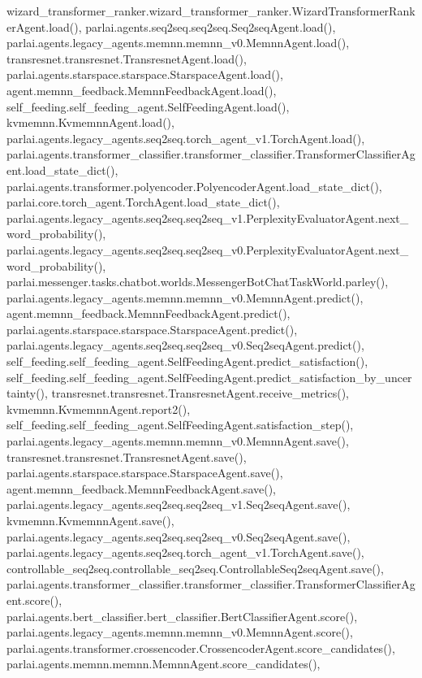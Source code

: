 wizard\+\_\+transformer\+\_\+ranker.\+wizard\+\_\+transformer\+\_\+ranker.\+Wizard\+Transformer\+Ranker\+Agent.\+load(), parlai.\+agents.\+seq2seq.\+seq2seq.\+Seq2seq\+Agent.\+load(), parlai.\+agents.\+legacy\+\_\+agents.\+memnn.\+memnn\+\_\+v0.\+Memnn\+Agent.\+load(), transresnet.\+transresnet.\+Transresnet\+Agent.\+load(), parlai.\+agents.\+starspace.\+starspace.\+Starspace\+Agent.\+load(), agent.\+memnn\+\_\+feedback.\+Memnn\+Feedback\+Agent.\+load(), self\+\_\+feeding.\+self\+\_\+feeding\+\_\+agent.\+Self\+Feeding\+Agent.\+load(), kvmemnn.\+Kvmemnn\+Agent.\+load(), parlai.\+agents.\+legacy\+\_\+agents.\+seq2seq.\+torch\+\_\+agent\+\_\+v1.\+Torch\+Agent.\+load(), parlai.\+agents.\+transformer\+\_\+classifier.\+transformer\+\_\+classifier.\+Transformer\+Classifier\+Agent.\+load\+\_\+state\+\_\+dict(), parlai.\+agents.\+transformer.\+polyencoder.\+Polyencoder\+Agent.\+load\+\_\+state\+\_\+dict(), parlai.\+core.\+torch\+\_\+agent.\+Torch\+Agent.\+load\+\_\+state\+\_\+dict(), parlai.\+agents.\+legacy\+\_\+agents.\+seq2seq.\+seq2seq\+\_\+v1.\+Perplexity\+Evaluator\+Agent.\+next\+\_\+word\+\_\+probability(), parlai.\+agents.\+legacy\+\_\+agents.\+seq2seq.\+seq2seq\+\_\+v0.\+Perplexity\+Evaluator\+Agent.\+next\+\_\+word\+\_\+probability(), parlai.\+messenger.\+tasks.\+chatbot.\+worlds.\+Messenger\+Bot\+Chat\+Task\+World.\+parley(), parlai.\+agents.\+legacy\+\_\+agents.\+memnn.\+memnn\+\_\+v0.\+Memnn\+Agent.\+predict(), agent.\+memnn\+\_\+feedback.\+Memnn\+Feedback\+Agent.\+predict(), parlai.\+agents.\+starspace.\+starspace.\+Starspace\+Agent.\+predict(), parlai.\+agents.\+legacy\+\_\+agents.\+seq2seq.\+seq2seq\+\_\+v0.\+Seq2seq\+Agent.\+predict(), self\+\_\+feeding.\+self\+\_\+feeding\+\_\+agent.\+Self\+Feeding\+Agent.\+predict\+\_\+satisfaction(), self\+\_\+feeding.\+self\+\_\+feeding\+\_\+agent.\+Self\+Feeding\+Agent.\+predict\+\_\+satisfaction\+\_\+by\+\_\+uncertainty(), transresnet.\+transresnet.\+Transresnet\+Agent.\+receive\+\_\+metrics(), kvmemnn.\+Kvmemnn\+Agent.\+report2(), self\+\_\+feeding.\+self\+\_\+feeding\+\_\+agent.\+Self\+Feeding\+Agent.\+satisfaction\+\_\+step(), parlai.\+agents.\+legacy\+\_\+agents.\+memnn.\+memnn\+\_\+v0.\+Memnn\+Agent.\+save(), transresnet.\+transresnet.\+Transresnet\+Agent.\+save(), parlai.\+agents.\+starspace.\+starspace.\+Starspace\+Agent.\+save(), agent.\+memnn\+\_\+feedback.\+Memnn\+Feedback\+Agent.\+save(), parlai.\+agents.\+legacy\+\_\+agents.\+seq2seq.\+seq2seq\+\_\+v1.\+Seq2seq\+Agent.\+save(), kvmemnn.\+Kvmemnn\+Agent.\+save(), parlai.\+agents.\+legacy\+\_\+agents.\+seq2seq.\+seq2seq\+\_\+v0.\+Seq2seq\+Agent.\+save(), parlai.\+agents.\+legacy\+\_\+agents.\+seq2seq.\+torch\+\_\+agent\+\_\+v1.\+Torch\+Agent.\+save(), controllable\+\_\+seq2seq.\+controllable\+\_\+seq2seq.\+Controllable\+Seq2seq\+Agent.\+save(), parlai.\+agents.\+transformer\+\_\+classifier.\+transformer\+\_\+classifier.\+Transformer\+Classifier\+Agent.\+score(), parlai.\+agents.\+bert\+\_\+classifier.\+bert\+\_\+classifier.\+Bert\+Classifier\+Agent.\+score(), parlai.\+agents.\+legacy\+\_\+agents.\+memnn.\+memnn\+\_\+v0.\+Memnn\+Agent.\+score(), parlai.\+agents.\+transformer.\+crossencoder.\+Crossencoder\+Agent.\+score\+\_\+candidates(), parlai.\+agents.\+memnn.\+memnn.\+Memnn\+Agent.\+score\+\_\+candidates(), 